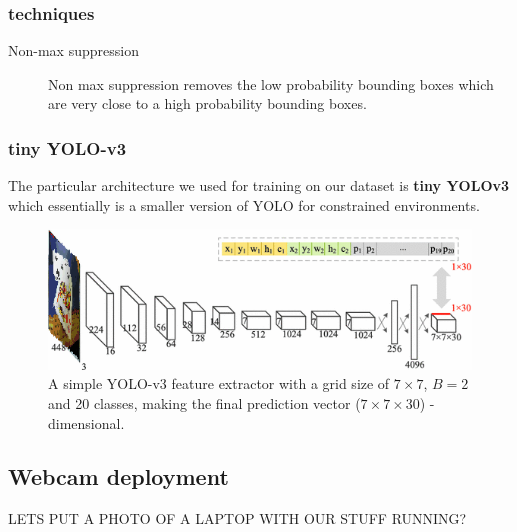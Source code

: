\documentclass[a4paper]{article}
\begin{document}
\subsubsection*{techniques}
\begin{description}
\item[Non-max suppression] Non max suppression removes the low probability bounding boxes which are very close to a high probability bounding boxes.
\end{description}

\subsubsection*{tiny YOLO-v3}

The particular architecture we used for training on our dataset is \textbf{tiny YOLOv3} which essentially is a smaller version of YOLO for constrained environments.
\begin{figure}


\includegraphics[width=1\linewidth]{images/tinyyolo}
\caption{A simple YOLO-v3 feature extractor with a grid size of $7\times 7$, $B=2$ and 20 classes, making the final prediction vector ($7 \times 7 \times 30$) - dimensional. }
\end{figure}

\subsection{Webcam deployment}
LETS PUT A PHOTO OF A LAPTOP WITH OUR STUFF RUNNING?
\end{document}
